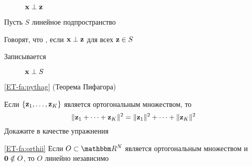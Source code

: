 \begin{frame}

    \begin{figure}
       \begin{center}
        
        \caption{\label{f:xpz} ${\mathbf x} \perp {\mathbf z}$}
       \end{center}
    \end{figure}

\end{frame}

\begin{frame}

     \vspace{2em}
    Пусть $S$ линейное подпространство
    
    \vspace{.7em}
    Говорят, что 
    , если ${\mathbf x} \perp {\mathbf z}$ для всех 
    ${\mathbf z} \in S$

    Записывается 
    
\end{frame}


\begin{frame}
    
    \begin{figure}
       \begin{center}
        
        \caption{\label{f:xpS} ${\mathbf x} \perp S$}
       \end{center}
    \end{figure}

\end{frame}

\begin{frame}

    \vspace{2em}
    \Fact\eqref{ET-fa:pythag}
        (Теорема Пифагора)
        
        Если $\{{\mathbf z}_1,\ldots, {\mathbf z}_K\}$ является ортогональным множеством, то
        \begin{equation*}
            \| {\mathbf z}_1 + \cdots + {\mathbf z}_K \|^2 
            = \| {\mathbf z}_1 \|^2 + \cdots + \| {\mathbf z}_K \|^2 
        \end{equation*}
    Докажите в качестве упражнения 
    
    \vspace{.7em}
    \Fact\eqref{ET-fa:orthii}
    Если $O \subset \RR^N$ является ортогональным множеством и ${\mathbf 0} \notin O$, то
    $O$ линейно независимо
    
\end{frame}

